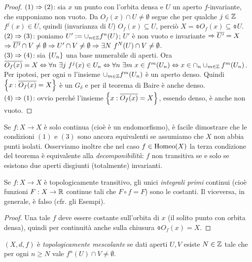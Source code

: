 \begin{proof}$(1)\Rightarrow (2)$: sia $x$ un punto con l'orbita densa e $U$ un aperto $f$-invariante, che supponiamo non vuoto.
Da $O_f(x)\cap U\neq\emptyset$ segue che per qualche $j\in\mathbb{Z}$ $f^j(x)\in U$, quindi (invarianza di $U$) $O_f(x)\subseteq U$,
perciò $X=\obar{O_f(x)}\subseteq\obar{U}$. \\
$(2)\Rightarrow (3)$: poniamo $U':=\cup_{n\in\mathbb{Z}}f^n(U)$; $U'$ è non vuoto e invariante $\Rightarrow\overline{U'}=X$
$\Rightarrow \overline{U'}\cap V\neq\emptyset \Rightarrow U'\cap V\neq\emptyset \Rightarrow \exists N\ f^N(U)\cap V\neq\emptyset$. \\
$(3)\Rightarrow(4)$: sia $\left\{U_n\right\}$ una base numerabile di aperti. Ora $\obar{O_f(x)}=X\sse \forall n\ \exists j\ f^j(x)\in U_n
\sse \forall n\ \exists m\ x\in f^m(U_n)\sse x\in\cap_n\cup_{m\in\Z} f^m(U_n)$.
Per ipotesi, per ogni $n$ l'insieme $\cup_{m\in\mathbb{Z}} f^m(U_n)$ è un aperto denso.
Quindi $\left\{x:\overline{O_f(x)}=X\right\}$ è un $G_\delta$ e per il teorema di Baire è anche denso. \\
$(4)\Rightarrow (1)$: ovvio perché l'insieme $\left\{x:\overline{O_f(x)}=X\right\}$, essendo denso, è anche non vuoto.
\end{proof}

\begin{oss} Se $f:X\to X$ è solo continua (cioè è un endomorfismo), è facile dimostrare che le condizioni $(1)$ e $(3)$ sono
  ancora equivalenti se assumiamo che $X$ non abbia punti isolati.\newline
  Osserviamo inoltre che nel caso $f\in\operatorname{Homeo} (X)$ la terza condizione del teorema è equivalente alla \emph{decomponibilità}: 
  $f$ non transitiva se e solo se esistono due aperti disgiunti (totalmente) invarianti.
\end{oss}

\begin{prop}Se $f:X\to X$ è topologicamente transitivo, gli unici \emph{integrali primi} continui (cioè
funzioni $F:X\to\mathbb{R}$ continue tali che $F\circ f=F$) sono le costanti. Il viceversa, in generale, è falso (cfr. gli Esempi).
\end{prop}

\begin{proof}Una tale $f$ deve essere costante sull'orbita di $x$ (il solito punto con orbita densa), quindi per continuità anche
sulla chiusura $\obar{O_f(x)}=X$.
\end{proof}

\begin{defi} $(X,d,f)$ è \emph{topologicamente mescolante} se dati aperti $U,V$ esiste $N\in\mathbb{Z}$ tale che per ogni $n\geq N$ vale $f^n(U)\cap V\neq \emptyset$.\end{defi}

